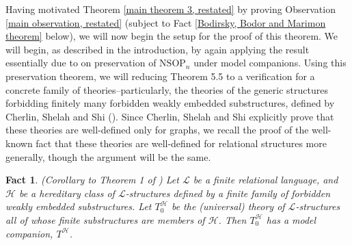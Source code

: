 \documentclass{amsart}
\newtheorem{fact}[theorem]{Fact}
\theoremstyle{definition}
\theoremstyle{remark}
\numberwithin{equation}{section}
\begin{document}
Having motivated Theorem \ref{main theorem 3, restated} by proving Observation \ref{main observation, restated} (subject to Fact \ref{Bodirsky, Bodor and Marimon theorem} below), we will now begin the setup for the proof of this theorem. We will begin, as described in the introduction, by again applying the result essentially due to \cite{BBM25} on preservation of $\mathrm{NSOP}_{n}$ under model companions. Using this preservation theorem, we will reducing Theorem 5.5 to a verification for a concrete family of theories--particularly, the theories of the generic structures forbidding finitely many forbidden weakly embedded substructures, defined by Cherlin, Shelah and Shi (\cite{CSS99}). Since Cherlin, Shelah and Shi explicitly prove that these theories are well-defined only for graphs, we recall the proof of the well-known fact that these theories are well-defined for relational structures more generally, though the argument will be the same.

\begin{fact}
  \label{Cherlin Shelah and Shi theorem} \emph{(Corollary to Theorem 1 of \cite{CSS99})} Let $\mathcal{L}$ be a finite relational language, and $\mathcal{H}$ be a hereditary class of $\mathcal{L}$-structures defined by a finite family of forbidden weakly embedded substructures. Let $T_{0}^{\mathcal{H}}$ be the (universal) theory of $\mathcal{L}$-structures all of whose finite substructures are members of $\mathcal{H}$. Then $T^{\mathcal{H}}_{0}$ has a model companion, $T^{\mathcal{H}}$.
\end{fact}
\end{document}
